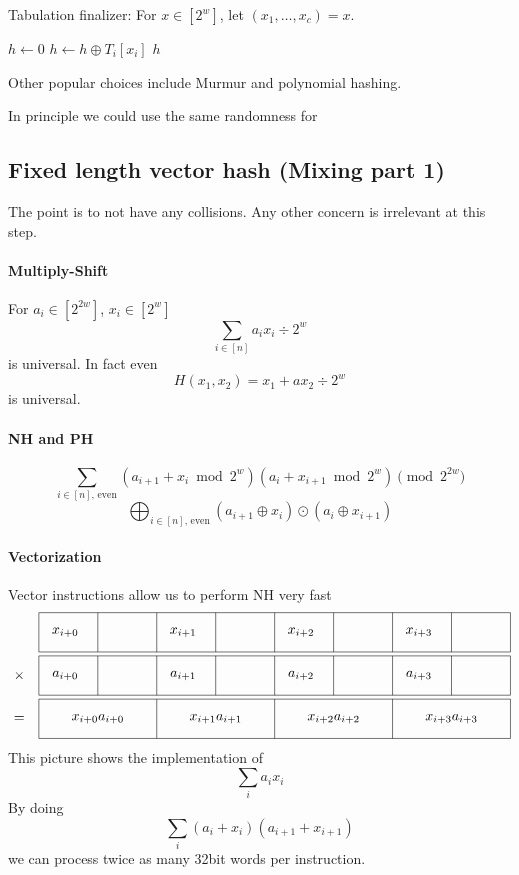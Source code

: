 \begin{algorithm}[H]
   \caption{
      Tabulation finalizer:
      For $x\in[2^w]$, let $(x_1, \dots, x_c) = x$.
   }
   \begin{algorithmic}
      \State $h\gets 0$
         \State $h\gets h \oplus T_i[x_i]$
      \EndFor
      \State \Return $h$
   \end{algorithmic}
\end{algorithm}

Other popular choices include Murmur and polynomial hashing.

In principle we could use the same randomness for 

\subsection{Fixed length vector hash (Mixing part 1)}

The point is to not have any collisions.
Any other concern is irrelevant at this step.

\paragraph{Multiply-Shift}
For $a_i\in[2^{2w}]$, $x_i\in[2^w]$
\[
   \sum_{i\in[n]} a_{i} x_i \div 2^{w}
\]
is universal.
In fact even
\[
   H(x_1, x_2) = x_1 + a x_2 \div 2^w
\]
is universal.

\paragraph{NH and PH}

\[
   \sum_{i\in[n]\text{, even}} (a_{i+1} + x_i \bmod 2^w)(a_i + x_{i+1} \bmod 2^w) \pmod{2^{2w}}
\]
\[
   \bigoplus_{i\in[n]\text{, even}} (a_{i+1} \oplus x_i)\odot(a_i \oplus x_{i+1})
\]

\paragraph{Vectorization}

Vector instructions allow us to perform NH very fast
\[
\begin{tikzpicture}
   \foreach \y in {0, -1.1, -2.2} {
      \draw (0, \y) -- (12, \y);
      \draw (0, \y-1) -- (12, \y-1);
   }
   \foreach \y in {0, -1.1}
      \foreach \x in {0,1.5,...,12}
         \draw (\x, \y) -- (\x, \y-1);
   \foreach \x in {0,3,...,12}
      \draw (\x, -2.2) -- (\x, -3.2);
   \node [draw=none] at (-.5, -1.6) {$\times$};
   \node [draw=none] at (-.5, -2.7) {$=$};
   \foreach \x in {0,1,...,3} {
      \node [draw=none] at (3*\x+.67, -.5) {$x_{i+\x}$};
      \node [draw=none] at (3*\x+.67, -1.6) {$a_{i+\x}$};
      \node [draw=none] at (3*\x+1.5, -2.7) {$x_{i+\x}a_{i+\x}$};
   }
\end{tikzpicture}
\]
This picture shows the implementation of 
\[
   \sum_i a_ix_i
\]
By doing
\[
   \sum_i (a_i+x_i)(a_{i+1}+x_{i+1})
\]
we can process twice as many 32bit words per instruction.

